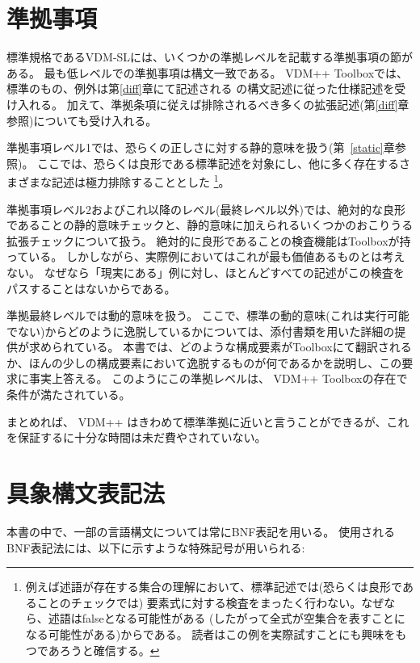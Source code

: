 \documentclass[\pformat,12pt]{jarticle}
\newcommand{\vdmslpp}[2]{%
#2
}
\newcommand{\vdmsl}{VDM-SL}
\newcommand{\vdmpp}{VDM++}
\begin{document}
\section{準拠事項}
\label{conformance}

標準規格であるVDM-SLには、いくつかの準拠レベルを記載する準拠事項の節がある。
最も低レベルでの準拠事項は構文一致である。
\vdmslpp{\vdmsl}{\vdmpp} Toolboxでは、\vdmslpp{標準}{標準のもの、例外は第\ref{diff}章にて記述される}の構文記述に従った仕様記述を受け入れる。
加えて、準拠条項に従えば排除されるべき多くの拡張記述(第\ref{diff}章参照)についても受け入れる。

準拠事項レベル1では、恐らくの正しさに対する静的意味を扱う(第~\ref{static}章参照)。
ここでは、恐らくは良形である標準記述を対象にし、他に多く存在するさまざまな記述は極力排除することとした
\footnote{例えば述語が存在する集合の理解において、標準記述では(恐らくは良形であることのチェックでは)
要素式に対する検査をまったく行わない。なぜなら、述語はfalseとなる可能性がある
(したがって全式が空集合を表すことになる可能性がある)からである。
読者はこの例を実際試すことにも興味をもつであろうと確信する。}。

準拠事項レベル2およびこれ以降のレベル(最終レベル以外)では、絶対的な良形であることの静的意味チェックと、静的意味に加えられるいくつかのおこりうる拡張チェックについて扱う。
絶対的に良形であることの検査機能はToolboxが持っている。
しかしながら、実際例においてはこれが最も価値あるものとは考えない。
なぜなら「現実にある」例に対し、ほとんどすべての記述がこの検査をパスすることはないからである。

準拠最終レベルでは動的意味を扱う。
ここで、標準の動的意味(これは実行可能でない)からどのように逸脱しているかについては、添付書類を用いた詳細の提供が求められている。
本書では、どのような構成要素がToolboxにて翻訳されるか、ほんの少しの構成要素において逸脱するものが何であるかを説明し、この要求に事実上答える。
このようにこの準拠レベルは、\vdmslpp{VDM-SL}{\vdmpp}Toolboxの存在で条件が満たされている。

まとめれば、 \vdmslpp{VDM-SL}{\vdmpp}はきわめて標準準拠に近いと言うことができるが、これを保証するに十分な時間は未だ費やされていない。

\section{具象構文表記法}
\label{syntax-notation}

本書の中で、一部の言語構文については常にBNF表記を用いる。
使用されるBNF表記法には、以下に示すような特殊記号が用いられる:
\end{document}
